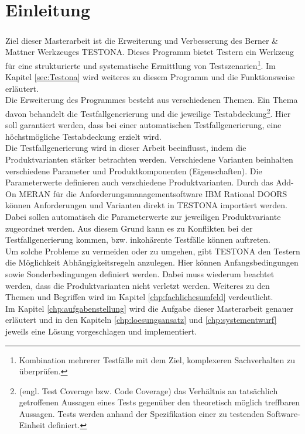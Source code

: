 \chapter{Einleitung}\label{chp:einleitung}
\paragraph{}
Ziel dieser Masterarbeit ist die Erweiterung und Verbesserung des Berner \& Mattner Werkzeuges TESTONA. Dieses Programm bietet Testern ein Werkzeug für eine strukturierte und systematische Ermittlung von Testszenarien\footnote{Kombination mehrerer Testfälle mit dem Ziel, komplexeren Sachverhalten zu überprüfen.}\cite{TESTONA}. Im Kapitel \ref{sec:Testona} wird weiteres zu diesem Programm und die Funktionsweise erläutert.\\

Die Erweiterung des Programmes besteht aus verschiedenen Themen. Ein Thema davon behandelt die Testfallgenerierung und die jeweilige Testabdeckung\footnote{(engl. Test Coverage bzw. Code Coverage) das Verhältnis an tatsächlich getroffenen Aussagen eines Tests gegenüber den theoretisch möglich treffbaren Aussagen. Tests werden anhand der Spezifikation einer zu testenden Software-Einheit definiert.\cite{TestAbdeckung}}. Hier soll garantiert werden, dass bei einer automatischen Testfallgenerierung, eine höchstmögliche Testabdeckung erzielt wird.\\

Die Testfallgenerierung wird in dieser Arbeit beeinflusst, indem die Produktvarianten stärker betrachten werden. Verschiedene Varianten beinhalten verschiedene Parameter und Produktkomponenten (Eigenschaften). Die Parameterwerte definieren auch verschiedene Produktvarianten. Durch das Add-On MERAN für die Anforderungsmanagementsoftware \glqq IBM Rational DOORS\grqq~ können Anforderungen und Varianten direkt in  TESTONA importiert werden. Dabei sollen automatisch die Parameterwerte zur jeweiligen Produktvariante zugeordnet werden. Aus diesem Grund kann es zu Konflikten bei der Testfallgenerierung kommen, bzw. inkohärente Testfälle können auftreten.\\

Um solche Probleme zu vermeiden oder zu umgehen, gibt TESTONA den Testern die Möglichkeit Abhängigkeitsregeln anzulegen. Hier können Anfangsbedingungen sowie Sonderbedingungen definiert werden. Dabei muss wiederum beachtet werden, dass die Produktvarianten nicht verletzt werden. Weiteres zu den Themen und Begriffen wird im Kapitel \ref{chp:fachlichesumfeld} verdeutlicht.\\

Im Kapitel \ref{chp:aufgabenstellung} wird die Aufgabe dieser Masterarbeit genauer erläutert und in den Kapiteln \ref{chp:loesungsansatz} und \ref{chp:systementwurf} jeweils eine Lösung vorgeschlagen und implementiert.

